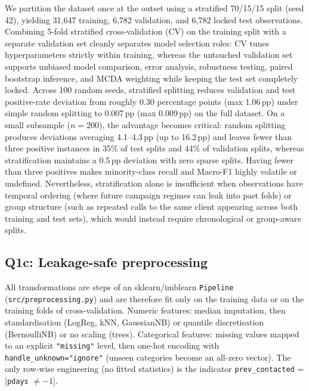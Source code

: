 We partition the dataset once at the outset using a stratified 70/15/15 split (seed 42), yielding 31,647 training, 6,782 validation, and 6,782 locked test observations. Combining 5-fold stratified cross-validation (CV) on the training split with a separate validation set cleanly separates model selection roles: CV tunes hyperparameters strictly within training, whereas the untouched validation set supports unbiased model comparison, error analysis, robustness testing, paired bootstrap inference, and MCDA weighting while keeping the test set completely locked. Across 100 random seeds, stratified splitting reduces validation and test positive-rate deviation from roughly 0.30 percentage points (max 1.06\,pp) under simple random splitting to 0.007\,pp (max 0.009\,pp) on the full dataset. On a small subsample ($n = 200$), the advantage becomes critical: random splitting produces deviations averaging 4.1--4.3\,pp (up to 16.2\,pp) and leaves fewer than three positive instances in 35\% of test splits and 44\% of validation splits, whereas stratification maintains a 0.5\,pp deviation with zero sparse splits. Having fewer than three positives makes minority-class recall and Macro-F1 highly volatile or undefined. Nevertheless, stratification alone is insufficient when observations have temporal ordering (where future campaign regimes can leak into past folds) or group structure (such as repeated calls to the same client appearing across both training and test sets), which would instead require chronological or group-aware splits.

\subsection{Q1c: Leakage-safe preprocessing}
All transformations are steps of an sklearn/imblearn \texttt{Pipeline} (\texttt{src/preprocessing.py}) and are
therefore fit only on the training data or on the training folds of cross-validation. Numeric features: median
imputation, then standardisation (LogReg, kNN, GaussianNB) or quantile discretisation (BernoulliNB) or no
scaling (trees). Categorical features: missing values mapped to an explicit \texttt{"missing"} level, then
one-hot encoding with \texttt{handle\_unknown="ignore"} (unseen categories become an all-zero vector). The only
row-wise engineering (no fitted statistics) is the indicator \texttt{prev\_contacted} = [\texttt{pdays} $\neq -1$].

